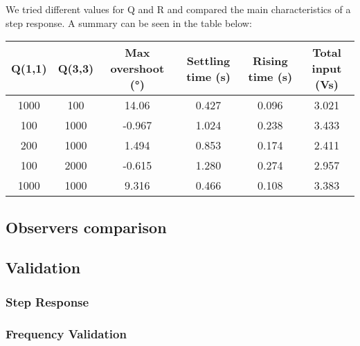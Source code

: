 We tried different values for Q and R and compared the main characteristics of a step response.
A summary can be seen in the table below:

\begin{table}[h!]
    \centering
    \hspace*{-3em}
    \begin{tabular}{||c c c c c c||} 
    \hline
    Q(1,1)  & Q(3,3) & Max overshoot (°) & Settling time (s)& Rising time (s) & Total input (Vs)\\ 
    \hline\hline
    1000 & 100 & 14.06 & 0.427 & 0.096 & 3.021 \\ 
    \hline
    100 & 1000 & -0.967 & 1.024 & 0.238 & 3.433 \\
    \hline
    200 & 1000 & 1.494 & 0.853 & 0.174 & 2.411 \\
    \hline
    100 & 2000 & -0.615 & 1.280 & 0.274 & 2.957 \\
    \hline
    1000 & 1000 & 9.316 & 0.466 & 0.108 & 3.383 \\ [1ex] 
    \hline
    \end{tabular}
\end{table}


\subsection{Observers comparison}

\subsection{Validation}

\subsubsection{Step Response}

\subsubsection{Frequency Validation}